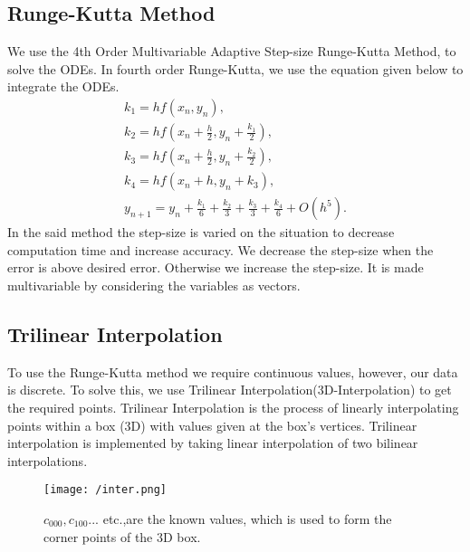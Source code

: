 \documentclass[fleqn]{report}
\begin{document}
	\subsection{Runge-Kutta Method}
	We use the 4th Order Multivariable Adaptive Step-size Runge-Kutta Method, to solve the ODEs. In fourth order Runge-Kutta, we use the equation given below to integrate the ODEs.
	\begin{align}
		k_{1}=hf(x_{n},y_{n}),\\
		k_{2}=hf(x_{n}+\frac{h}{2}, y_{n}+\frac{k_{1}}{2}),\\
		k_{3}=hf(x_{n}+\frac{h}{2}, y_{n}+\frac{k_{2}}{2}),\\
		k_{4}=hf(x_{n}+h, y_{n}+k_{3}),\\
		y_{n+1}=y_{n}+\frac{k_{1}}{6}+\frac{k_{2}}{3}+\frac{k_{3}}{3}+\frac{k_{4}}{6}+O(h^{5}).
	\end{align}
	In the said method the step-size is varied on the situation to decrease computation time and  increase accuracy. We decrease the step-size when the error is above desired error. Otherwise we increase the step-size. It is made multivariable by considering the variables as vectors. 
	\subsection{Trilinear Interpolation}
	To use the Runge-Kutta method we require continuous values, however, our data is discrete. To solve this, we use Trilinear Interpolation(3D-Interpolation) to get the required points. Trilinear Interpolation is the process of linearly interpolating points within a box (3D) with values given at the box’s vertices. Trilinear interpolation is implemented by taking linear interpolation of two bilinear interpolations.
		\begin{figure}[!ht]
		\centering
		\texttt{[image: /inter.png]}
		\caption{$c_{000},c_{100}$... etc.,are the known values, which is used to form the corner points of the 3D box.}
		\label{fig:inter}
	\end{figure}
\end{document}

